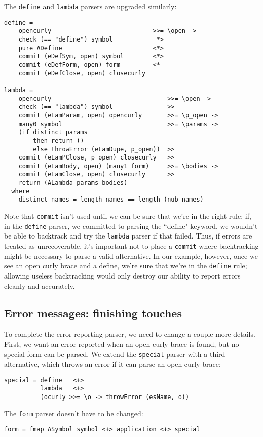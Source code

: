 \documentclass{tmr}
\begin{document}
The \verb+define+ and \verb+lambda+ parsers are upgraded similarly:
\begin{verbatim}
define =
    opencurly                            >>= \open ->
    check (== "define") symbol            *>
    pure ADefine                         <*>
    commit (eDefSym, open) symbol        <*>
    commit (eDefForm, open) form         <*
    commit (eDefClose, open) closecurly  

lambda =
    opencurly                                >>= \open ->
    check (== "lambda") symbol               >>
    commit (eLamParam, open) opencurly       >>= \p_open ->
    many0 symbol                             >>= \params ->
    (if distinct params 
        then return ()
        else throwError (eLamDupe, p_open))  >>
    commit (eLamPClose, p_open) closecurly   >>
    commit (eLamBody, open) (many1 form)     >>= \bodies ->
    commit (eLamClose, open) closecurly      >>
    return (ALambda params bodies)
  where
    distinct names = length names == length (nub names)
\end{verbatim}

Note that \verb+commit+ isn't used until we can be sure that we're in the right 
rule:   if, in the \verb+define+ parser, we committed to parsing the ``define" 
keyword, we wouldn't be able to backtrack and try the \verb+lambda+ parser if 
that failed.  Thus, if errors are treated as unrecoverable, it's important not to 
place a \verb+commit+ where backtracking might be necessary to parse a valid 
alternative.  In our example, however, once 
we see an open curly brace and a define, we're sure that we're in the \verb+define+
rule; allowing useless backtracking would only destroy our ability to report 
errors cleanly and accurately.

\subsection{Error messages:  finishing touches}
To complete the error-reporting parser, we need to change a couple more details. 
First, we want an error reported when an open curly brace is found, but no 
special form can be parsed.  We extend the \verb+special+ 
parser with a third alternative, which throws an error if it can parse
an open curly brace:
\begin{verbatim}
special = define   <+> 
          lambda   <+> 
          (ocurly >>= \o -> throwError (esName, o))
\end{verbatim}

The \verb+form+ parser doesn't have to be changed:
\begin{verbatim}
form = fmap ASymbol symbol <+> application <+> special
\end{verbatim}
\end{document}
